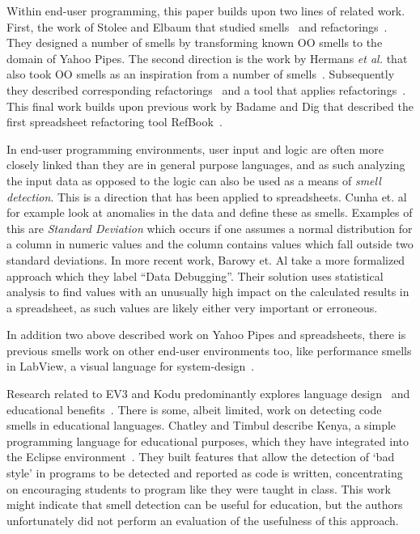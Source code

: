 \documentclass{sig-alternate}
\begin{document}
Within end-user programming, this paper builds upon two lines of related work. First, the work of Stolee and Elbaum that studied smells~\cite{StoleeTSE2013} and refactorings~\cite{Stolee2011}. They designed a number of smells by transforming known OO smells to the domain of Yahoo Pipes. The second direction is the work by Hermans \emph{et al.} that also took OO smells as an inspiration from a number of smells~\cite{Hermans2012intra, Hermans2012inter}. Subsequently they described corresponding refactorings~\cite{Hermans2012intraExt} and a tool that applies refactorings~\cite{hermans2014bumblebee}. This final work builds upon previous work by Badame and Dig that described the first spreadsheet refactoring tool RefBook~\cite{badame2012refactoring}.

In end-user programming environments, user input and logic are often more closely linked than they are in general purpose languages, and as such analyzing the input data as opposed to the logic can also be used as a means of \emph{smell detection}. This is a direction that has been applied to spreadsheets. Cunha et. al \cite{cunha2012towards} for example look at anomalies in the data and define these as smells. Examples of this are \textit{Standard Deviation} which occurs if one assumes a normal distribution for a column in numeric values and the column contains values which fall outside two standard deviations. In more recent work, Barowy et. Al \cite{barowy2014checkcell} take a more formalized approach which they label ``Data Debugging''. Their solution uses statistical analysis to find values with an unusually high impact on the calculated results in a spreadsheet, as such values are likely either very important or erroneous.

In addition two above described work on Yahoo Pipes and spreadsheets, there is previous smells work on other end-user environments too, like performance smells in LabView, a visual language for system-design~\cite{chambers2013smell, chambers2015impact}. 

Research related to  EV3 and Kodu predominantly explores 
language design~\cite{Fristoe:2011:SSE:2159365.2159396, Stolee:2011:ECS:1953163.1953197, MacLaurin:2009:KEP:1536513.1536516, MacLaurin:2011:DKT:1925844.1926413} 
and educational benefits~\cite{Fowler:2011:KGL:2159365.2159398, Touretzky:2013:AKC:2445196.2445374, Barnes:2002:TIJ:563340.563397, Hood:2005:TPL:1067445.1067454}. 
There is some, albeit limited, work on detecting code smells in educational languages. Chatley and Timbul describe Kenya, a simple programming language for educational purposes, which they have integrated into the Eclipse environment~\cite{Chatley2005}. They built features that allow the detection of `bad style' in programs to be detected and reported as code is written, concentrating on encouraging students to program like they were taught in class. This work might indicate that smell detection can be useful for education, but the authors unfortunately did not perform an evaluation of the usefulness of this approach.
\end{document}

